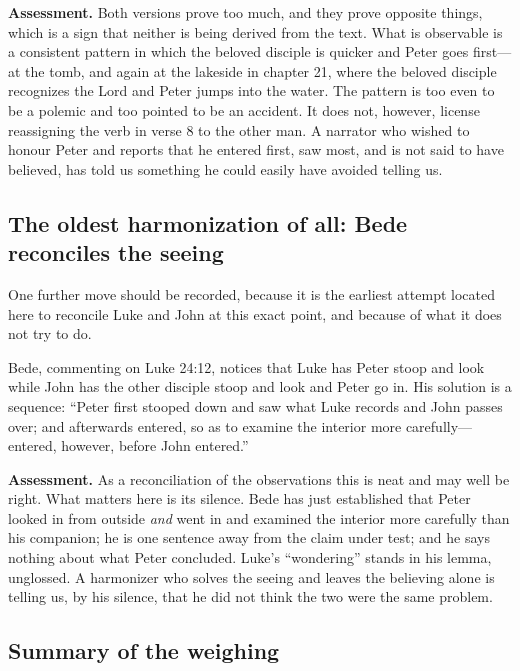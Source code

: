 \textbf{Assessment.} Both versions prove too much, and they prove opposite
things, which is a sign that neither is being derived from the text. What is
observable is a consistent pattern in which the beloved disciple is quicker and
Peter goes first---at the tomb, and again at the lakeside in chapter 21, where
the beloved disciple recognizes the Lord and Peter jumps into the water. The
pattern is too even to be a polemic and too pointed to be an accident. It does
not, however, license reassigning the verb in verse 8 to the other man. A
narrator who wished to honour Peter and reports that he entered first, saw
most, and is not said to have believed, has told us something he could easily
have avoided telling us.

\subsection{The oldest harmonization of all: Bede reconciles the seeing}

One further move should be recorded, because it is the earliest attempt located
here to reconcile Luke and John at this exact point, and because of what it does
not try to do.

Bede, commenting on Luke 24:12, notices that Luke has Peter stoop and look while
John has the other disciple stoop and look and Peter go in. His solution is a
sequence: ``Peter first stooped down and saw what Luke records and John passes
over; and afterwards entered, so as to examine the interior more
carefully---entered, however, before John entered.''

\textbf{Assessment.} As a reconciliation of the observations this is neat and
may well be right. What matters here is its silence. Bede has just established
that Peter looked in from outside \emph{and} went in and examined the interior
more carefully than his companion; he is one sentence away from the claim under
test; and he says nothing about what Peter concluded. Luke's ``wondering'' stands
in his lemma, unglossed. A harmonizer who solves the seeing and leaves the
believing alone is telling us, by his silence, that he did not think the two
were the same problem.

\subsection{Summary of the weighing}

